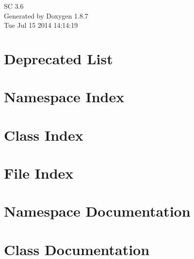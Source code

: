 \documentclass[twoside]{book}
\newcommand{\+}{\discretionary{\mbox{\scriptsize$\hookleftarrow$}}{}{}}
\newcommand{\clearemptydoublepage}{%
  \newpage{\pagestyle{empty}\cleardoublepage}%
}
\begin{document}
\hypersetup{pageanchor=false,
             bookmarks=true,
             bookmarksnumbered=true,
             pdfencoding=unicode
            }
\begin{titlepage}
\vspace*{7cm}
\begin{center}%
{\Large S\+C 3.6 }\\
\vspace*{1cm}
{\large Generated by Doxygen 1.8.7}\\
\vspace*{0.5cm}
{\small Tue Jul 15 2014 14:14:19}\\
\end{center}
\end{titlepage}
\clearemptydoublepage
\tableofcontents
\clearemptydoublepage
{}
\hypersetup{pageanchor=true}

\chapter{Deprecated List}
\label{deprecated}
\hypertarget{deprecated}{}

\chapter{Namespace Index}

\chapter{Class Index}

\chapter{File Index}

\chapter{Namespace Documentation}

\chapter{Class Documentation}























\end{document}
